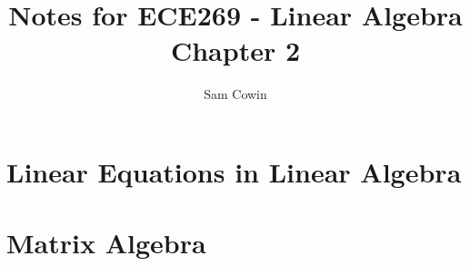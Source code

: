 \documentclass[12pt]{article}
\begin{document}
    
\title{Notes for ECE269 - Linear Algebra \\
\large Chapter 2}
\author{Sam Cowin}
\maketitle

\section{Linear Equations in Linear Algebra}
\section{Matrix Algebra}
\end{document}
